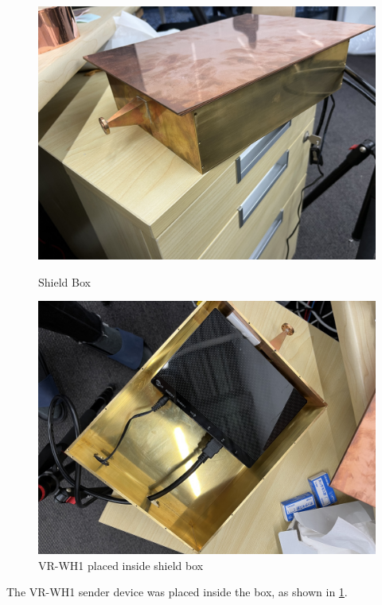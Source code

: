 \documentclass[a4paper,12pt]{report}
\begin{document}
\begin{figure}
  \centering
  \begin{minipage}{0.45\textwidth}
    \centering
    \includegraphics[clip, keepaspectratio, width=0.9\linewidth]{img/brass_box.jpg}
    \caption{Shield Box}
    \label{img:brass_box}
  \end{minipage}\hfill
  \begin{minipage}{0.45\textwidth}
    \centering
    \includegraphics[clip, keepaspectratio, width=0.9\linewidth]{img/inside_brass_box.jpg}
    \caption{VR-WH1 placed inside shield box}
    \label{img:inside_brass_box}
  \end{minipage}\hfill
\end{figure}

The VR-WH1 sender device was placed inside the box,
as shown in \ref{img:inside_brass_box}.
\end{document}
